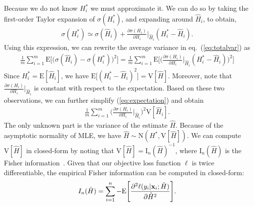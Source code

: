 Because we do not know $H_i^*$ we must approximate it. We can do so by taking the first-order Taylor expansion of $\sigma(H^*_i)$, and expanding around $\hat{H}_i$, to obtain,
\begin{align}
    \sigma(H^*_i) \simeq \sigma(\hat{H}_i) + \frac{\partial \sigma(H_i)}{\partial H_i} \Big|_{\hat{H}_i} (H_i^* - \hat{H}_i). \label{eq:taylor}
\end{align}
Using this expression, we can rewrite the average variance in eq.~(\ref{eq:totalvar}) as
\begin{align}
    \frac{1}{m}\sum_{i=1}^{m}\text{E}\Big[\big(\sigma(\hat{H}_i)-\sigma(H_i^*)\big)^2\Big]  = \frac{1}{m}\sum_{i=1}^{m}\text{E}\Bigg[\Bigg(\frac{\partial \sigma(H_i)}{\partial H_i}\Big|_{\hat{H}_i}(H_i^* - \hat{H}_i)\Bigg)^2\Bigg] \label{eq:expectation}
\end{align}
Since $H_i^* = \text{E}[\hat{H}_i]$, we have $\text{E}\Big[(H_i^* - \hat{H}_i)^2\Big] = \text{V}[\hat{H}]$. Moreover, note that $\frac{\partial \sigma(H_i)}{\partial H_i}\Big|_{\hat{H}_i}$ is constant with respect to the expectation. Based on these two observations, we can further simplify (\ref{eq:expectation}) and obtain
\begin{align}
    \frac{1}{m} \sum_{i=1}^{m}\Big(\frac{\partial \sigma(H_i)}{\partial H_i}\Big|_{\hat{H}_i}\Big)^2 \text{V}[\hat{H}_i]. \label{eq:delta}
\end{align}
The only unknown part is the variance of the estimate $\hat{H}$. Because of the asymptotic normality of MLE, we have $\hat{H} \sim \text{N}(H^*,\text{V}[\hat{H}])$. We can compute $\text{V}[\hat{H}]$ in closed-form by noting that $\text{V}[\hat{H}] = \text{I}_n(\hat{H})^{-1}$, where $\text{I}_n(\hat{H})$ is the Fisher information~\citep{le1986asymptotic}. 
Given that our objective loss function $\ell$ is twice differentiable, the empirical Fisher information can be computed in closed-form:
\begin{align}
     I_n(\hat{H}) = %
	\sum_{i=1}^n -  \textrm{E}
	 \Bigg[ \frac{\partial^2 \ell(y_i|\x_i;\hat{H})}{\partial \hat{H}^2}\Bigg]. \label{eq:fisher}
\end{align}
 

